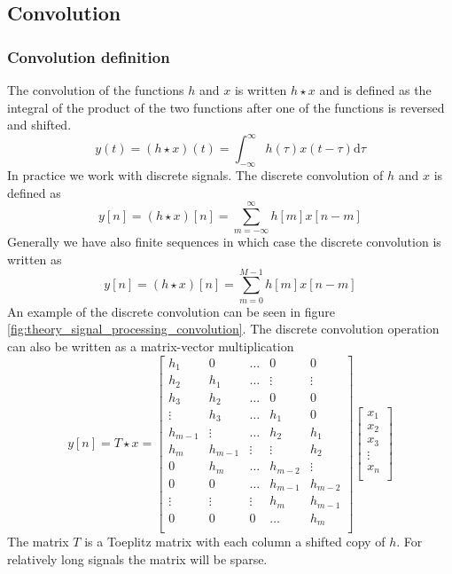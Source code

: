 \newpage
\subsection{Convolution}

\subsubsection{Convolution definition}
The convolution of the functions $h$ and $x$ is written $h \star x$ and is defined as the integral of the product of the two functions after one of the functions is reversed and shifted.
\begin{equation}
 y(t) = (h \star x)(t) = \int_{-\infty}^{\infty} h(\tau)x(t-\tau) \mathrm{d}\tau
\end{equation}
In practice we work with discrete signals. The discrete convolution of $h$ and $x$ is defined as
\begin{equation}
 y [n] = (h \star x )[n] = \sum_{m=-\infty}^{\infty} h[m] x[n-m]
\end{equation}
Generally we have also finite sequences in which case the discrete convolution is written as
\begin{equation}\label{eq:theory_signal_processing_convolution_fir}
 y [n] = (h \star x )[n] = \sum_{m=0}^{M-1} h[m] x[n-m]
\end{equation}
An example of the discrete convolution can be seen in figure \ref{fig:theory_signal_processing_convolution}.
The discrete convolution operation can also be written as a matrix-vector multiplication
\begin{equation}\label{eq:theory_signal_processing_convolution_toeplitz}
 y [n] = T \star x =
 \begin{bmatrix}
 h_1 & 0 & \hdots & 0 & 0 \\
 h_2 & h_1 & \hdots & \vdots & \vdots \\
 h_3 & h_2 & \hdots & 0 & 0 \\
 \vdots & h_3 & \hdots & h_1 & 0 \\
 h_{m-1} & \vdots & \hdots & h_2 & h_1 \\
 h_m & h_{m-1} & \vdots & \vdots & h_2 \\
 0 & h_m & \hdots & h_{m-2} & \vdots \\
 0 & 0 & \hdots & h_{m-1} & h_{m-2} \\
 \vdots & \vdots & \vdots & h_{m} & h_{m-1} \\
 0 & 0 & 0 & \hdots & h_{m} \\
 \end{bmatrix}
 \begin{bmatrix}
  x_1 \\
  x_2 \\
  x_3 \\
  \vdots \\
  x_n \\
 \end{bmatrix}
\end{equation}
The matrix $T$ is a Toeplitz matrix with each column a shifted copy of $h$.
For relatively long signals the matrix will be sparse.

